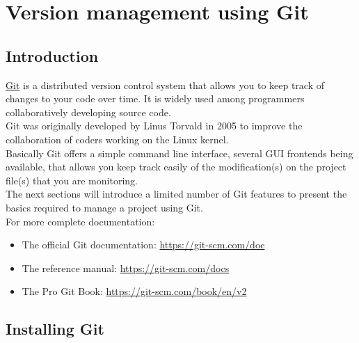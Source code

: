 \chapter{Version management using Git}

\section{Introduction}

\href{https://git-scm.com}{Git} is a distributed version control system that allows you to keep track of changes to your code over time. 
It is widely used among programmers collaboratively developing source code. \\[0.25cm]
Git was originally developed by Linus Torvald in 2005 to improve the collaboration of coders working on the Linux kernel. \\[0.25cm]
Basically Git offers a simple command line interface, several GUI frontends being available, 
that allows you keep track easily of the modification(s) on the project file(s) that you are monitoring. \\
The next sections will introduce a limited number of Git features to present the basics required to manage a project using Git. \\
For more complete documentation:
\begin{itemize}
\item The official Git documentation: \href{https://git-scm.com/doc}{https://git-scm.com/doc}
\item The reference manual: \href{https://git-scm.com/docs}{https://git-scm.com/docs}
\item The Pro Git Book: \href{https://git-scm.com/book/en/v2}{https://git-scm.com/book/en/v2}
\end{itemize}

\section{Installing Git}

